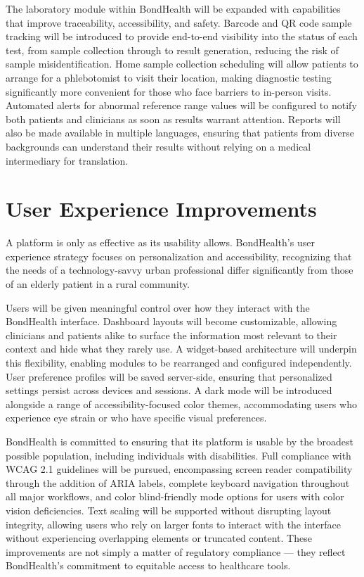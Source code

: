 \noindent The laboratory module within BondHealth will be expanded with capabilities that improve traceability, accessibility, and safety. Barcode and QR code sample tracking will be introduced to provide end-to-end visibility into the status of each test, from sample collection through to result generation, reducing the risk of sample misidentification. Home sample collection scheduling will allow patients to arrange for a phlebotomist to visit their location, making diagnostic testing significantly more convenient for those who face barriers to in-person visits. Automated alerts for abnormal reference range values will be configured to notify both patients and clinicians as soon as results warrant attention. Reports will also be made available in multiple languages, ensuring that patients from diverse backgrounds can understand their results without relying on a medical intermediary for translation.

\section{User Experience Improvements}

\noindent A platform is only as effective as its usability allows. BondHealth's user experience strategy focuses on personalization and accessibility, recognizing that the needs of a technology-savvy urban professional differ significantly from those of an elderly patient in a rural community.

\noindent Users will be given meaningful control over how they interact with the BondHealth interface. Dashboard layouts will become customizable, allowing clinicians and patients alike to surface the information most relevant to their context and hide what they rarely use. A widget-based architecture will underpin this flexibility, enabling modules to be rearranged and configured independently. User preference profiles will be saved server-side, ensuring that personalized settings persist across devices and sessions. A dark mode will be introduced alongside a range of accessibility-focused color themes, accommodating users who experience eye strain or who have specific visual preferences.

\noindent BondHealth is committed to ensuring that its platform is usable by the broadest possible population, including individuals with disabilities. Full compliance with WCAG 2.1 guidelines will be pursued, encompassing screen reader compatibility through the addition of ARIA labels, complete keyboard navigation throughout all major workflows, and color blind-friendly mode options for users with color vision deficiencies. Text scaling will be supported without disrupting layout integrity, allowing users who rely on larger fonts to interact with the interface without experiencing overlapping elements or truncated content. These improvements are not simply a matter of regulatory compliance --- they reflect BondHealth's commitment to equitable access to healthcare tools.

